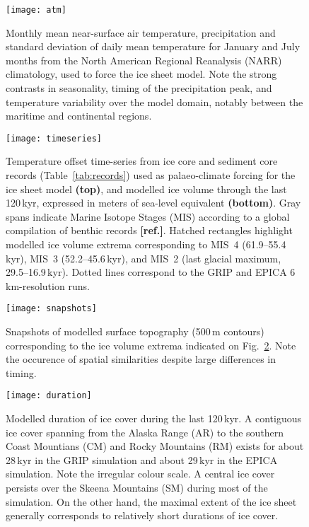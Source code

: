 \documentclass[tc, ms]{copernicus}
\newcommand{\aref}[0]{\textbf{[ref.]}}
\renewcommand{\citep}[1]{\aref}
\begin{document}
\begin{figure}
  \texttt{[image: atm]}
  \caption{Monthly mean near-surface air temperature, precipitation and
           standard deviation of daily mean temperature for January and July
           months from the North American Regional Reanalysis (NARR)
           climatology, used to force the ice sheet model. Note the
           strong contrasts in seasonality, timing of the precipitation peak,
           and temperature variability over the model domain, notably between
           the maritime and continental regions.}
  \label{fig:atm}
\end{figure}

\begin{figure}
  \texttt{[image: timeseries]}
  \caption{Temperature offset time-series from ice core and sediment core
           records (Table~\ref{tab:records}) used as palaeo-climate forcing for
           the ice sheet model \textbf{(top)}, and modelled ice volume
           through the last 120\,\unit{kyr}, expressed in meters of sea-level
           equivalent \textbf{(bottom)}. Gray spans indicate Marine Isotope
           Stages (MIS) according to a global compilation of benthic
            records \citep{lisiecki-raymo-2005}. Hatched
           rectangles highlight modelled ice volume extrema corresponding to
           MIS~4 (61.9--55.4\,\unit{kyr}), MIS~3 (52.2--45.6\,\unit{kyr}), and
           MIS~2 (last glacial maximum, 29.5--16.9\,\unit{kyr}). Dotted lines
           correspond to the GRIP and EPICA 6\,\unit{km}-resolution runs.}
  \label{fig:timeseries}
\end{figure}

\begin{figure}
  \texttt{[image: snapshots]}
  \caption{Snapshots of modelled surface topography (500\,\unit{m} contours)
           corresponding to the ice volume extrema indicated on
           Fig.~\ref{fig:timeseries}. Note the occurence of spatial similarities
           despite large differences in timing.}
  \label{fig:snapshots}
\end{figure}

\begin{figure}
  \texttt{[image: duration]}
  \caption{Modelled duration of ice cover during the last 120\,\unit{kyr}.
           A contiguous ice cover spanning from the Alaska Range (AR) to the
           southern Coast Mountians (CM) and Rocky Mountains (RM) exists for
           about 28\,\unit{kyr} in the GRIP simulation and about 29\,\unit{kyr}
           in the EPICA simulation. Note the irregular colour scale. A central
           ice cover persists over the Skeena Mountains (SM) during most of the
           simulation. On the other hand, the maximal extent of the ice sheet
           generally corresponds to relatively short durations of ice cover.}
  \label{fig:duration}
\end{figure}
\end{document}
